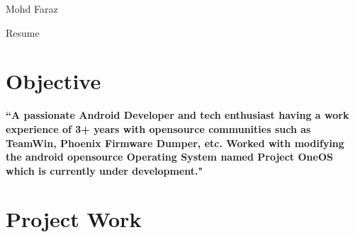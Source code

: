\documentclass[
	10pt, %
]{FreemanCV}
\begin{document}
\begin{paracol}{2} %


\parbox[][0.11\textheight][c]{\linewidth}{ %
	\centering %
	
	{\sffamily\Huge Mohd Faraz} %
	
	\medskip %
	
	{\cursivefont\Huge\textcolor{headings}{Resume}}
	
	\vfill %
}


\section{Objective}

{\raggedright\textbf{``A passionate Android Developer and tech enthusiast having a work experience of 3+ years with opensource communities such as TeamWin, Phoenix Firmware Dumper, etc. Worked with modifying the android opensource Operating System named Project OneOS which is currently under development."}\par}

\medskip %


\section{Project Work}




\end{paracol}
\end{document}
